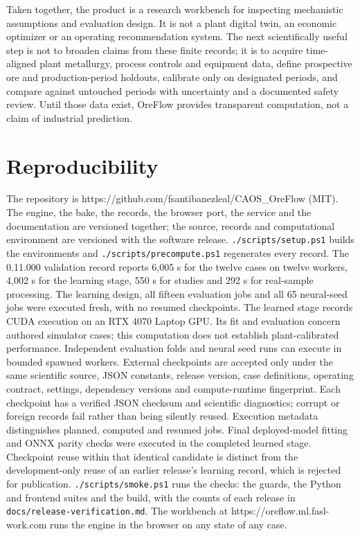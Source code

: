 \documentclass[10pt]{article}
\begin{document}
Taken together, the product is a research workbench for inspecting
mechanistic assumptions and evaluation design. It is not a plant digital
twin, an economic optimizer or an operating recommendation system. The
next scientifically useful step is not to broaden claims from these
finite records; it is to acquire time-aligned plant metallurgy, process
controls and equipment data, define prospective ore and production-period holdouts,
calibrate only on designated periods, and compare against untouched
periods with uncertainty and a documented safety review. Until those
data exist, OreFlow provides transparent computation, not
a claim of industrial prediction.

\section{Reproducibility}\label{reproducibility}

The repository is https://github.com/fsantibanezleal/CAOS\_OreFlow
(MIT). The engine, the bake, the records, the browser port, the service
and the documentation are versioned together; the source, records and
computational environment are versioned with the software release.
\texttt{./scripts/setup.ps1} builds the environments and
\texttt{./scripts/precompute.ps1} regenerates every record. The
0.11.000 validation record reports 6,005 s for the twelve cases on
twelve workers, 4,002 s for the learning stage, 550 s for studies and 292 s
for real-sample processing. The learning design, all fifteen evaluation jobs
and all 65 neural-seed jobs were executed fresh, with no resumed
checkpoints. The learned stage records CUDA execution on an RTX 4070
Laptop GPU. Its fit and evaluation concern authored simulator cases;
this computation does not establish plant-calibrated performance. Independent
evaluation folds and neural seed runs can execute in bounded spawned
workers. External checkpoints are accepted only under the same
scientific source, JSON constants, release version, case definitions,
operating contract, settings, dependency versions and compute-runtime
fingerprint. Each checkpoint has a verified JSON checksum and scientific
diagnostics; corrupt or foreign records fail rather than being silently
reused. Execution metadata distinguishes planned, computed and resumed
jobs. Final deployed-model fitting and ONNX parity checks were executed
in the completed learned stage. Checkpoint reuse within that identical
candidate is distinct from the development-only reuse of an earlier
release's learning record, which is rejected for publication.
\texttt{./scripts/smoke.ps1} runs the checks: the guards, the Python and
frontend suites and the build, with the counts of each release in
\texttt{docs/release-verification.md}. The workbench at
https://oreflow.ml.fasl-work.com runs the engine in the browser on any
state of any case.
\end{document}
